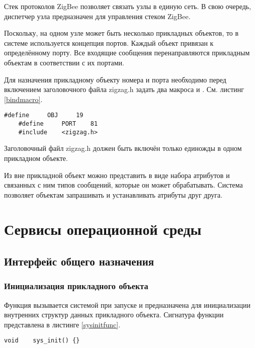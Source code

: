 Стек протоколов ZigBee позволяет связать узлы в единую сеть. В свою очередь, диспетчер узла предназначен
для управления стеком ZigBee. 

Поскольку, на одном узле может быть несколько прикладных объектов, то в системе \zigzag используется
концепция портов. Каждый объект привязан к определённому порту. Все входящие сообщения перенаправляются
прикладным объектам в соответствии с их портами. 

Для назначения прикладному объекту номера и порта необходимо перед включением заголовочного файла
zigzag.h задать два макроса  и . См. листинг \ref{bindmacro}.

\begin{lstlisting}[caption=Назначение объекту номера и порта, label=bindmacro]
    #define     OBJ     19
    #define     PORT    81
    #include    <zigzag.h>
\end{lstlisting}

Заголовочный файл zigzag.h должен быть включён только единожды в одном прикладном объекте.

Из вне прикладной объект можно представить в виде набора атрибутов и связанных с ним типов сообщений, которые
он может обрабатывать. Система \zigzag позволяет объектам запрашивать и устанавливать атрибуты друг друга.

\section{Сервисы операционной среды}

\subsection{Интерфейс общего назначения}

\subsubsection{Инициализация прикладного объекта}

Функция  вызывается системой \zigzag при запуске и предназначена
для инициализации внутренних структур данных прикладного объекта. Сигнатура функции
представлена в листинге \ref{sysinitfunc}.

\begin{lstlisting}[caption=\myfunc{sys\_init()} - инициализация системы, label=sysinitfunc ]
    void    sys_init() {}
\end{lstlisting}

